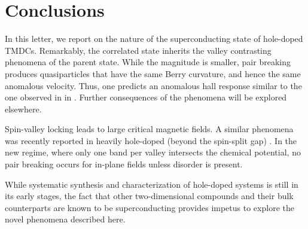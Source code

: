 \section{Conclusions}

In this letter, we report on the nature of the superconducting state
of hole-doped TMDCs.
Remarkably, the correlated state inherits
the valley contrasting phenomena of the parent state.
While the magnitude is smaller, pair breaking produces quasiparticles
that have the same Berry curvature, and hence the same anomalous velocity.
Thus, one predicts an anomalous hall response similar to
the one observed in in .
Further consequences of the phenomena will be explored elsewhere.

Spin-valley locking leads to large critical magnetic fields.
A similar phenomena was recently reported in heavily hole-doped
(beyond the spin-split gap) .
In the new regime, where only one band per valley intersects
the chemical potential, no pair breaking occurs
for in-plane fields unless disorder is present.

While systematic synthesis and characterization of hole-doped systems
is still in its early stages, the fact that other two-dimensional compounds
and their bulk counterparts are known to be superconducting
provides impetus to explore the novel phenomena described here.
